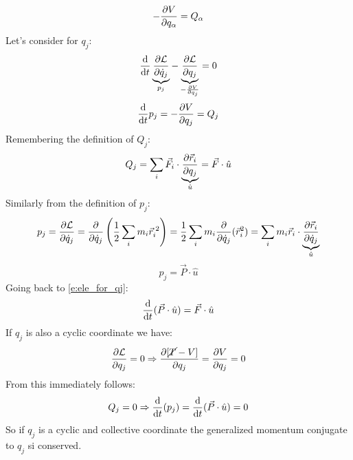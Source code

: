\begin{equation}
    -\dfrac{\partial V}{\partial q_{\alpha}} = Q_{\alpha}
\end{equation}
Let's consider \eleref\;for $q_j$:
\begin{equation}
    \dfrac{\mathrm{d} }{\mathrm{d}t}\underbrace{\dfrac{\partial \mathcal{L}}{\partial \dot{q}_j}}_{p_j} - \underbrace{\dfrac{\partial \mathcal{L}}{\partial q_j}}_{-\frac{\partial V}{\partial q_j}} = 0
\end{equation}
\begin{equation} \label{e:ele_for_qj}
    \dfrac{\mathrm{d} }{\mathrm{d}t}p_j = -\dfrac{\partial V}{\partial q_j} = Q_j
\end{equation}
Remembering the definition of $Q_j$:
\begin{equation}
    Q_j = \displaystyle\sum_i \vec{F}_i \cdot \underbrace{\dfrac{\partial \vec{r}_i}{\partial q_j}}_{\hat{u}} = \vec{F}\cdot \hat{u}
\end{equation}
Similarly from the definition of $p_j$:
\begin{equation}
    p_j = \dfrac{\partial \mathcal{L}}{\partial \dot{q}_j} = \dfrac{\partial }{\partial \dot{q}_j}\left(\dfrac{1}{2}\displaystyle\sum_i m_i \vec{r}_i^{\;2}\right) = \dfrac{1}{2}\displaystyle\sum_i m_i \dfrac{\partial }{\partial \dot{q}_j}(\vec{r}_i^2) = \displaystyle\sum_i m_i \vec{r}_i \cdot \underbrace{\dfrac{\partial \vec{r}_i}{\partial \dot{q}_j}}_{\hat{u}}
\end{equation}
\begin{equation}
    p_j = \vec{P}\cdot\hat{u}
\end{equation}
Going back to \eqref{e:ele_for_qj}:
\begin{equation}
    \dfrac{\mathrm{d} }{\mathrm{d}t}(\vec{P}\cdot\hat{u}) = \vec{F}\cdot \hat{u}
\end{equation}
If $q_j$ is also a cyclic coordinate we have:
\begin{equation}
    \dfrac{\partial \mathcal{L}}{\partial q_j} = 0 \Rightarrow \dfrac{\partial [\cancel{T}-V]}{\partial q_j} = \dfrac{\partial V}{\partial q_j} = 0
\end{equation}
From this immediately follows:
\begin{equation}
    Q_j = 0 \Rightarrow \dfrac{\mathrm{d} }{\mathrm{d}t}(p_j) = \dfrac{\mathrm{d} }{\mathrm{d}t}(\vec{P}\cdot\hat{u}) = 0
\end{equation}
So if $q_j$ is a cyclic and collective coordinate the generalized momentum conjugate to $q_j$ si conserved.
